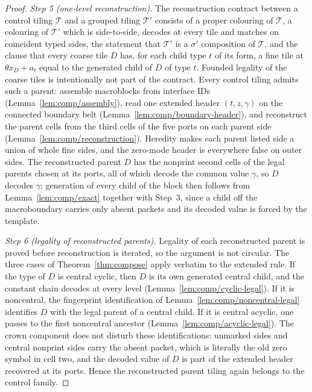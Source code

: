 \documentclass[11pt,a4paper]{article}
\theoremstyle{remark}
\begin{document}
\begin{proof}
\emph{Step 5 (one-level reconstruction).}  The reconstruction contract
between a control tiling $\mathcal T$ and a grouped tiling $\mathcal T'$
consists of a proper colouring of $\mathcal T$, a colouring of $\mathcal T'$
which is side-to-side, decodes at every tile and matches on coincident
typed sides, the statement that $\mathcal T'$ is a $\sigma'$ composition of
$\mathcal T$, and the clause that every coarse tile $D$ has, for each child
type $t$ of its form, a fine tile at $\theta x_D+a_t$ equal to the
generated child of $D$ of type $t$.  Founded legality of the coarse tiles is
intentionally not part of the contract.  Every control tiling admits such
a parent: assemble macroblocks from interface IDs
(Lemma~\ref{lem:comp/assembly}), read one extended header $(t,z,\gamma)$ on
the connected boundary belt (Lemma~\ref{lem:comp/boundary-header}), and
reconstruct the parent cells from the third cells of the five ports on each
parent side (Lemma~\ref{lem:comp/reconstruction}).  Heredity makes each
parent listed side a union of whole fine sides, and the zero-mode header is
everywhere false on outer sides.  The reconstructed parent $D$ has the
nonprint second cells of the legal parents chosen at its ports, all of
which decode the common value $\gamma$, so $D$ decodes $\gamma$; generation
of every child of the block then follows from Lemma~\ref{lem:comp/exact}
together with Step~3, since a child off the macroboundary carries only
absent packets and its decoded value is forced by the template.

\emph{Step 6 (legality of reconstructed parents).}  Legality of each
reconstructed parent is proved before reconstruction is iterated, so the
argument is not circular.  The three cases of Theorem~\ref{thm:compose}
apply verbatim to the extended rule.  If the type of $D$ is central cyclic,
then $D$ is its own generated central child, and the constant chain
decodes at every level (Lemma~\ref{lem:comp/cyclic-legal}).  If it is
noncentral, the fingerprint identification of
Lemma~\ref{lem:comp/noncentral-legal} identifies $D$ with the legal parent
of a central child.  If it is central acyclic, one passes to the first
noncentral ancestor (Lemma~\ref{lem:comp/acyclic-legal}).  The crown
component does not disturb these identifications: unmarked sides and
central nonprint sides carry the absent packet, which is literally the old
zero symbol in cell two, and the decoded value of $D$ is part of the
extended header recovered at its ports.  Hence the reconstructed parent
tiling again belongs to the control family.


\end{proof}
\end{document}

